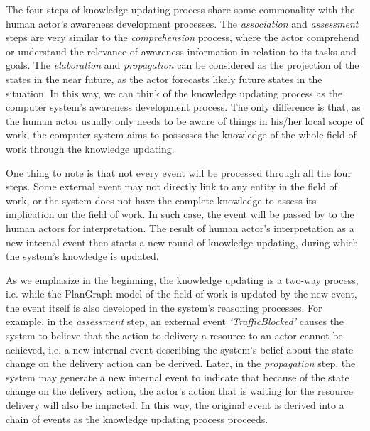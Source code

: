 The four steps of knowledge updating process share some commonality with the human actor's awareness development processes. The \emph{association} and \emph{assessment} steps are very similar to the \emph{comprehension} process, where the actor comprehend or understand the relevance of awareness information in relation to its tasks and goals. The \emph{elaboration} and \emph{propagation} can be considered as the projection of the states in the near future, as the actor forecasts likely future states in the situation. In this way, we can think of the knowledge updating process as the computer system's awareness development process. The only difference is that, as the human actor usually only needs to be aware of things in his/her local scope of work, the computer system aims to possesses the knowledge of the whole field of work through the knowledge updating.

One thing to note is that not every event will be processed through all the four steps. Some external event may not directly link to any entity in the field of work, or the system does not have the complete knowledge to assess its implication on the field of work. In such case, the event will be passed by to the human actors for interpretation. The result of human actor's interpretation as a new internal event then starts a new round of knowledge updating, during which the system's knowledge is updated.

As we emphasize in the beginning, the knowledge updating is a two-way process, i.e. while the PlanGraph model of the field of work is updated by the new event, the event itself is also developed in the system's reasoning processes. For example, in the \emph{assessment} step, an external event \emph{`TrafficBlocked'} causes the system to believe that the action to delivery a resource to an actor cannot be achieved, i.e. a new internal event describing the system's belief about the state change on the delivery action can be derived. Later, in the \emph{propagation} step, the system may generate a new internal event to indicate that because of the state change on the delivery action, the actor's action that is waiting for the resource delivery will also be impacted. In this way, the original event is derived into a chain of events as the knowledge updating process proceeds.

